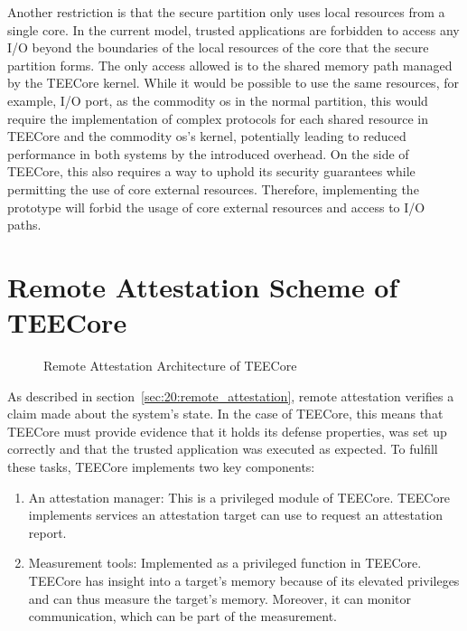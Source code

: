 Another restriction is that the secure partition only uses local resources from
a single core. In the current model, trusted applications are forbidden to
access any I/O beyond the boundaries of the local resources of the core that the
secure partition forms. The only access allowed is to the shared memory path
managed by the TEECore kernel. While it would be possible to use the same
resources, for example, I/O port, as the commodity \gls{os} in the normal
partition, this would require the implementation of complex protocols for each
shared resource in TEECore and the commodity \gls{os}'s kernel, potentially
leading to reduced performance in both systems by the introduced overhead. On
the side of TEECore, this also requires a way to uphold its security guarantees
while permitting the use of core external resources. Therefore, implementing the
prototype will forbid the usage of core external resources and access to I/O
paths.

\section{Remote Attestation Scheme of TEECore}
\label{sec:30:tee_ra_scheme}
\begin{figure}
  \begin{center}
    
    \caption{Remote Attestation Architecture of TEECore}
    \label{fig:30:tee_ra}
  \end{center}
\end{figure}
As described in section~\ref{sec:20:remote_attestation}, remote attestation
verifies a claim made about the system's state. In the case of TEECore, this
means that TEECore must provide evidence that it holds its defense properties,
was set up correctly and that the trusted application was executed as expected.
To fulfill these tasks, TEECore implements two key components:
\begin{enumerate}
  \item An attestation manager: This is a privileged module of
    TEECore. TEECore implements services an attestation target can use to
    request an attestation report.
  \item Measurement tools: Implemented as a privileged function in TEECore.
    TEECore has insight into a target's memory because of its elevated
    privileges and can thus measure the target's memory. Moreover, it can
    monitor communication, which can be part of the measurement.
\end{enumerate}

